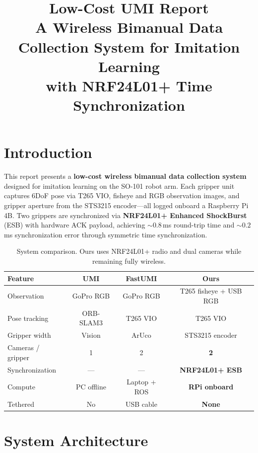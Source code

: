 \documentclass[11pt,a4paper]{article}
\title{\textbf{Low-Cost UMI Report}\\[0.3em]
\large A Wireless Bimanual Data Collection System for Imitation Learning\\
with NRF24L01+ Time Synchronization}
\author{}
\date{}
\begin{document}
\maketitle
\thispagestyle{fancy}
\tableofcontents
\newpage

\section{Introduction}

This report presents a \textbf{low-cost wireless bimanual data collection system} designed for imitation learning on the SO-101 robot arm. Each gripper unit captures 6DoF pose via T265 VIO, fisheye and RGB observation images, and gripper aperture from the STS3215 encoder---all logged onboard a Raspberry Pi 4B. Two grippers are synchronized via \textbf{NRF24L01+ Enhanced ShockBurst} (ESB) with hardware ACK payload, achieving ${\sim}0.8$\,ms round-trip time and ${\sim}0.2$\,ms synchronization error through symmetric time synchronization.

\begin{table}[htbp]
\centering
\caption{System comparison. Ours uses NRF24L01+ radio and dual cameras while remaining fully wireless.}
\begin{tabular}{l c c c}
\toprule
\textbf{Feature} & \textbf{UMI} & \textbf{FastUMI} & \textbf{Ours} \\
\midrule
Observation & GoPro RGB & GoPro RGB & T265 fisheye + USB RGB \\
Pose tracking & ORB-SLAM3 & T265 VIO & T265 VIO \\
Gripper width & Vision & ArUco & STS3215 encoder \\
Cameras / gripper & 1 & 2 & \textbf{2} \\
Synchronization & --- & --- & \textbf{NRF24L01+ ESB} \\
Compute & PC offline & Laptop + ROS & \textbf{RPi onboard} \\
Tethered & No & USB cable & \textbf{None} \\
\bottomrule
\end{tabular}
\end{table}


\section{System Architecture}
\end{document}
